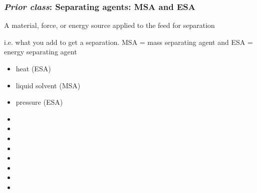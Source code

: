 

\begin{frame}\frametitle{\emph{Prior class}: {\color{purple} Separating agents}: MSA and ESA}
	\begin{exampleblock}
		{\small A material, force, or energy source applied to the feed for separation }
	\end{exampleblock}
	\vspace{6pt}
	i.e. what you add to get a separation. {\color{purple}MSA} = mass separating agent and {\color{purple}ESA} = energy separating agent
	\vspace{6pt}
	\begin{itemize}
		\item	heat (ESA)
		\item	liquid solvent (MSA)
		\item	pressure (ESA)
		\item	\pause\iftoggle{instructor}{vacuum}{}
		\item	\iftoggle{instructor}{membrane}{}
		\item	\iftoggle{instructor}{filter media}{}
		\item	\iftoggle{instructor}{electric field}{}
		\item	\iftoggle{instructor}{temperature gradient}{}
		\item	\iftoggle{instructor}{gravitational field (natural, or artificially created)}{}
		\item	\iftoggle{instructor}{adsorbent}{}
		\item	\iftoggle{instructor}{absorbent}{}
	\end{itemize}
\end{frame}

